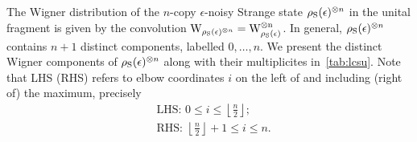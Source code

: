 The Wigner distribution of the $n$-copy $\epsilon$-noisy Strange state $\rho_{\rm{S}}(\epsilon)^{\otimes n}$ in the unital fragment is given by the convolution $\W{\rho_{\rm{S}}(\epsilon)^{\otimes n}} = \rm{W}_{\rho_{\rm{S}}(\epsilon)}^{\otimes n}$.
In general, $\rho_{\rm{S}}(\epsilon)^{\otimes n}$ contains $n + 1$ distinct components, labelled $0,\dots, n$.
We present the distinct Wigner components of $\rho_{\rm{S}}(\epsilon)^{\otimes n}$ along with their multiplicites in~\cref{tab:lcsu}.
Note that LHS (RHS) refers to elbow coordinates $i$ on the left of and including (right of) the maximum, precisely
\begin{align}
&\text{LHS: } 0 \leq i \leq \left\lfloor \frac{n}{2} \right\rfloor ; \\
&\text{RHS: } \left\lfloor \frac{n}{2} \right\rfloor +1 \leq i \leq n.
\end{align}
